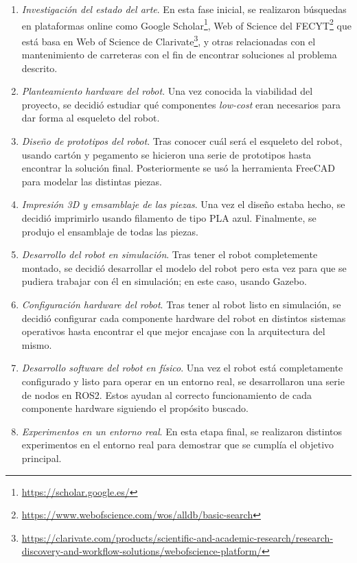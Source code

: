 \begin{enumerate}
	\item{\textit{Investigación del estado del arte}}. En esta fase inicial, se realizaron búsquedas en plataformas online como Google Scholar\footnote{\url{https://scholar.google.es/}}, Web of Science del FECYT\footnote{\url{https://www.webofscience.com/wos/alldb/basic-search}} que está basa en Web of Science de Clarivate\footnote{\url{https://clarivate.com/products/scientific-and-academic-research/research-discovery-and-workflow-solutions/webofscience-platform/}}, y otras relacionadas con el mantenimiento de carreteras con el fin de encontrar soluciones al problema descrito. 
	
	\item{\textit{Planteamiento hardware del robot}}. Una vez conocida la viabilidad del proyecto, se decidió estudiar qué componentes \textit{low-cost} eran necesarios para dar forma al esqueleto del robot. 
	
	\item{\textit{Diseño de prototipos del robot}}. Tras conocer cuál será el esqueleto del robot, usando cartón y pegamento se hicieron una serie de prototipos hasta encontrar la solución final. Posteriormente se usó la herramienta FreeCAD para modelar las distintas piezas.
	
	\item{\textit{Impresión 3D y emsamblaje de las piezas}}. Una vez el diseño estaba hecho, se decidió imprimirlo usando filamento de tipo PLA azul. Finalmente, se produjo el ensamblaje de todas las piezas.
	
	\item{\textit{Desarrollo del robot en simulación}}. Tras tener el robot completemente montado, se decidió desarrollar el modelo del robot pero esta vez para que se pudiera trabajar con él en simulación; en este caso, usando Gazebo.
	
	\item{\textit{Configuración hardware del robot}}. Tras tener al robot listo en simulación, se decidió configurar cada componente hardware del robot en distintos sistemas operativos hasta encontrar el que mejor encajase con la arquitectura del mismo. 
	
	\item{\textit{Desarrollo software del robot en físico}}. Una vez el robot está completamente configurado y listo para operar en un entorno real, se desarrollaron una serie de nodos en ROS2. Estos ayudan al correcto funcionamiento de cada componente hardware siguiendo el propósito buscado. 
	
	\item{\textit{Experimentos en un entorno real}}. En esta etapa final, se realizaron distintos experimentos en el entorno real para demostrar que se cumplía el objetivo principal.

\end{enumerate}

